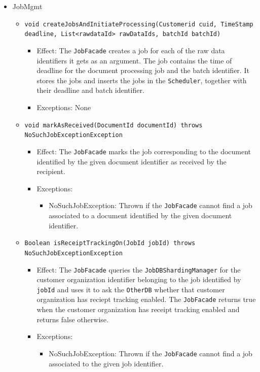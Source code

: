 \documentclass[a4paper,10pt]{article}
\begin{document}
\begin{itemize}
    \item JobMgmt
    \begin{itemize}
    	\item \texttt{void createJobsAndInitiateProcessing(Customerid cuid, TimeStamp deadline, List<rawdataId> rawDataIds, batchId batchId)}
    	\begin{itemize}
            \item Effect: The \texttt{JobFacade} creates a job for each of the raw data identifiers it gets as an argument. The job contains the time of deadline for the document processing job and the batch identifier. It stores the jobs and inserts the jobs in the \texttt{Scheduler}, together with their deadline and batch identifier.
            \item Exceptions: None
        \end{itemize}
    	
    	\item \texttt{void markAsReceived(DocumentId documentId) throws NoSuchJobExceptionException}
    	\begin{itemize}
    		\item Effect: The \texttt{JobFacade} marks the job corresponding to the document identified by the given document identifier as received by the recipient.
    		\item Exceptions:
    		\begin{itemize}
    			\item NoSuchJobException: Thrown if the \texttt{JobFacade} cannot find a job associated to a document identified by the given document identifier.
    		\end{itemize}
    	\end{itemize}
    	
    	\item \texttt{Boolean isReceiptTrackingOn(JobId jobId) throws NoSuchJobExceptionException}
    	\begin{itemize}
    		\item Effect: The \texttt{JobFacade} queries the \texttt{JobDBShardingManager} for the customer organization identifier belonging to the job identified by \texttt{jobId} and uses it to ask the \texttt{OtherDB} whether that customer organization has reciept tracking enabled. The \texttt{JobFacade} returns true when the customer organization has receipt tracking enabled and returns false otherwise.
    		\item Exceptions:
    		\begin{itemize}
    			\item NoSuchJobException: Thrown if the \texttt{JobFacade} cannot find a job associated to the given job identifier.
    		\end{itemize}
    	\end{itemize}
 	
    	
    \end{itemize}
\end{itemize}
\end{document}
